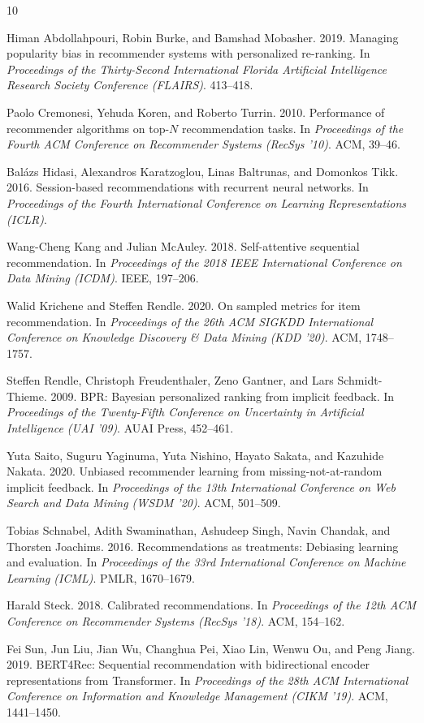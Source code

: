 \balance
\begin{thebibliography}{10}

Himan Abdollahpouri, Robin Burke, and Bamshad Mobasher. 2019.
Managing popularity bias in recommender systems with personalized re-ranking.
In \emph{Proceedings of the Thirty-Second International Florida Artificial
Intelligence Research Society Conference (FLAIRS)}. 413--418.

Paolo Cremonesi, Yehuda Koren, and Roberto Turrin. 2010.
Performance of recommender algorithms on top-$N$ recommendation tasks.
In \emph{Proceedings of the Fourth ACM Conference on Recommender Systems
(RecSys '10)}. ACM, 39--46.

Bal\'azs Hidasi, Alexandros Karatzoglou, Linas Baltrunas, and Domonkos Tikk. 2016.
Session-based recommendations with recurrent neural networks.
In \emph{Proceedings of the Fourth International Conference on Learning
Representations (ICLR)}.

Wang-Cheng Kang and Julian McAuley. 2018.
Self-attentive sequential recommendation.
In \emph{Proceedings of the 2018 IEEE International Conference on Data Mining
(ICDM)}. IEEE, 197--206.

Walid Krichene and Steffen Rendle. 2020.
On sampled metrics for item recommendation.
In \emph{Proceedings of the 26th ACM SIGKDD International Conference on
Knowledge Discovery \& Data Mining (KDD '20)}. ACM, 1748--1757.

Steffen Rendle, Christoph Freudenthaler, Zeno Gantner, and Lars Schmidt-Thieme.
2009. BPR: Bayesian personalized ranking from implicit feedback.
In \emph{Proceedings of the Twenty-Fifth Conference on Uncertainty in Artificial
Intelligence (UAI '09)}. AUAI Press, 452--461.

Yuta Saito, Suguru Yaginuma, Yuta Nishino, Hayato Sakata, and Kazuhide Nakata.
2020. Unbiased recommender learning from missing-not-at-random implicit feedback.
In \emph{Proceedings of the 13th International Conference on Web Search and Data
Mining (WSDM '20)}. ACM, 501--509.

Tobias Schnabel, Adith Swaminathan, Ashudeep Singh, Navin Chandak, and Thorsten
Joachims. 2016. Recommendations as treatments: Debiasing learning and evaluation.
In \emph{Proceedings of the 33rd International Conference on Machine Learning
(ICML)}. PMLR, 1670--1679.

Harald Steck. 2018. Calibrated recommendations.
In \emph{Proceedings of the 12th ACM Conference on Recommender Systems
(RecSys '18)}. ACM, 154--162.

Fei Sun, Jun Liu, Jian Wu, Changhua Pei, Xiao Lin, Wenwu Ou, and Peng Jiang.
2019. BERT4Rec: Sequential recommendation with bidirectional encoder
representations from Transformer.
In \emph{Proceedings of the 28th ACM International Conference on Information and
Knowledge Management (CIKM '19)}. ACM, 1441--1450.

\end{thebibliography}
